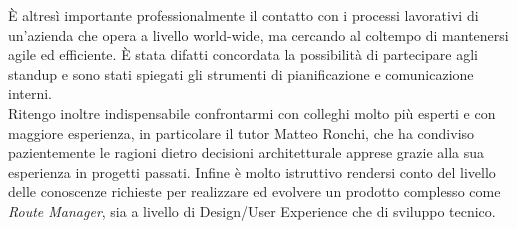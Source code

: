 È altresì importante professionalmente il contatto con i processi lavorativi di un'azienda che opera a livello world-wide, ma cercando al coltempo di mantenersi agile ed efficiente. È stata difatti concordata la possibilità di partecipare agli \gls{standup} e sono stati spiegati gli strumenti di pianificazione e comunicazione interni. \\

Ritengo inoltre indispensabile confrontarmi con colleghi molto più esperti e con maggiore esperienza, in particolare il tutor Matteo Ronchi, che ha condiviso pazientemente le ragioni dietro decisioni architetturale apprese grazie alla sua esperienza in progetti passati. 
Infine è molto istruttivo rendersi conto del livello delle conoscenze richieste per realizzare ed evolvere un prodotto complesso come \textit{Route Manager}, sia a livello di Design/User Experience che di sviluppo tecnico.
